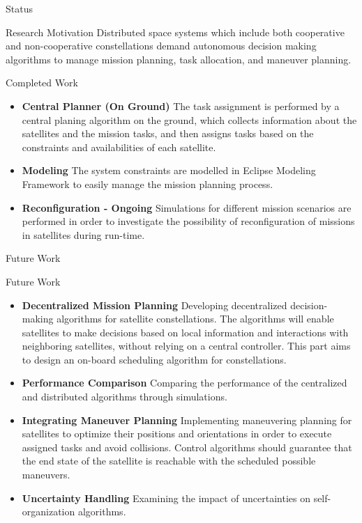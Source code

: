 \begin{frame}{Status}
	\begin{alertblock}{Research Motivation}
	Distributed space systems which include both cooperative and non-cooperative constellations demand autonomous decision making algorithms to manage mission planning, task allocation, and maneuver planning.
		
	\end{alertblock}

	\begin{block}{Completed Work}
		\begin{itemize}
			
			\item \textbf{Central Planner (On Ground)} The task assignment is performed by a central planing algorithm on the ground, which collects information about the satellites and the mission tasks, and then assigns tasks based on the constraints and availabilities of each satellite.
			\item \textbf{Modeling} The system constraints are modelled in Eclipse Modeling Framework to easily manage the mission planning process.
			\item \textbf{Reconfiguration - Ongoing} Simulations for different mission scenarios are performed in order to investigate the possibility of reconfiguration of missions in satellites during run-time.
		\end{itemize}
	\end{block}
\end{frame}

\begin{frame}{Future Work}
	

	\begin{block}{Future Work}
		\begin{itemize}
			\item \textbf{Decentralized Mission Planning} Developing decentralized decision-making algorithms for satellite constellations. The algorithms will enable satellites to make decisions based on local information and interactions with neighboring satellites, without relying on a central controller. This part aims to design an on-board scheduling algorithm for constellations.
			\item \textbf{Performance Comparison} Comparing the performance of the centralized and distributed algorithms through simulations.
			\item \textbf{Integrating Maneuver Planning} Implementing maneuvering planning for satellites to optimize their positions and orientations in order to execute assigned tasks and avoid collisions. Control algorithms should guarantee that the end state of the satellite is reachable with the scheduled possible maneuvers. 
			\item \textbf{Uncertainty Handling} Examining the impact of uncertainties on self-organization algorithms.
		\end{itemize}
	\end{block}
\end{frame}

